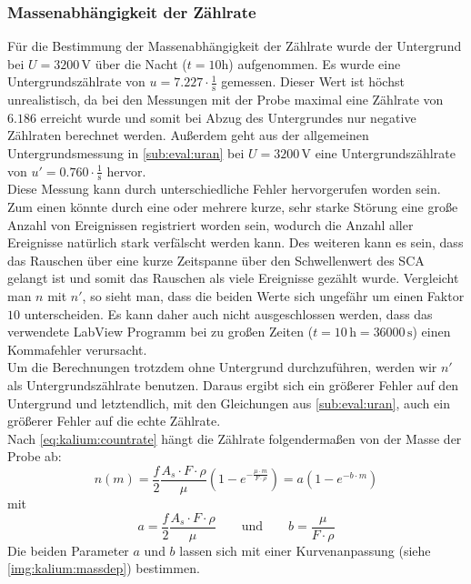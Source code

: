 \subsubsection{Massenabhängigkeit der Zählrate}
\label{subsub:kalium:massdep}
Für die Bestimmung der Massenabhängigkeit der Zählrate wurde der Untergrund bei $U=3200\,$V über die Nacht ($t=10$h) aufgenommen. Es wurde eine 
Untergrundszählrate von $u=7.227 \cdot \frac{1}{\text{s}}$ gemessen. Dieser Wert ist höchst unrealistisch, da bei den Messungen mit der Probe 
maximal eine Zählrate von $6.186$ erreicht wurde und somit bei Abzug des Untergrundes nur negative Zählraten berechnet werden. Außerdem 
geht aus der allgemeinen Untergrundsmessung in \ref{sub:eval:uran} bei $U=3200\,$V  eine Untergrundszählrate von $u'=0.760 \cdot \frac{1}{\text{s}}$ 
hervor. \\ 
Diese Messung kann durch unterschiedliche Fehler hervorgerufen worden sein. Zum einen könnte durch eine oder mehrere kurze, sehr starke 
Störung eine große Anzahl von Ereignissen registriert worden sein, wodurch die Anzahl aller Ereignisse natürlich stark verfälscht werden kann. Des 
weiteren kann es sein, dass das Rauschen über eine kurze Zeitspanne über den Schwellenwert des SCA gelangt ist und somit das Rauschen als viele 
Ereignisse gezählt wurde. Vergleicht man $n$ mit $n'$, so sieht man, dass die beiden Werte sich ungefähr um einen Faktor $10$ unterscheiden. Es kann 
daher auch nicht ausgeschlossen werden, dass das verwendete LabView Programm bei zu großen Zeiten ($t=10\,\text{h} = 36000\,\text{s}$) 
einen Kommafehler verursacht. \\
Um die Berechnungen trotzdem ohne Untergrund durchzuführen, werden wir $n'$ als Untergrundszählrate benutzen. Daraus ergibt sich ein größerer 
Fehler auf den Untergrund und letztendlich, mit den Gleichungen aus \ref{sub:eval:uran}, auch ein größerer Fehler auf die echte Zählrate.\\[\baselineskip]
Nach \autoref{eq:kalium:countrate} hängt die Zählrate folgendermaßen von der Masse der Probe ab:
\begin{equation}
  n(m) = \frac{f}{2} \frac{A_s \cdot F \cdot \rho}{\mu} \left( 1 - e^{- \frac{\mu \cdot m}{F \cdot \rho}} \right) = a(1-e^{-b \cdot m})
\end{equation}
mit
\begin{equation}
  a = \frac{f}{2} \frac{A_s \cdot F \cdot \rho}{\mu} \qquad \text{und} \qquad b = \frac{\mu}{F \cdot \rho}
\end{equation}
Die beiden Parameter $a$ und $b$ lassen sich mit einer Kurvenanpassung (siehe \autoref{img:kalium:massdep}) bestimmen. \\

